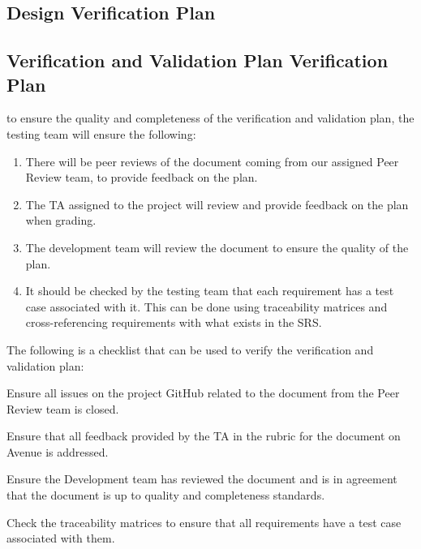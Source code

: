 \documentclass[12pt, titlepage]{article}
\begin{document}
\subsection{Design Verification Plan}




\subsection{Verification and Validation Plan Verification Plan}

to ensure the quality and completeness of the verification and
validation plan, the testing team will ensure the following:

\begin{enumerate}
  \item There will be peer reviews of the document coming from our
    assigned Peer Review team, to provide feedback on the plan.
  \item The TA assigned to the project will review and provide
    feedback on the plan when grading.
  \item The development team will review the document to ensure the
    quality of the plan.
  \item It should be checked by the testing team that each
    requirement has a test case associated with it. This can be done
    using traceability matrices and cross-referencing requirements
    with what exists in the SRS.
\end{enumerate}

The following is a checklist that can be used to verify the
verification and validation plan:
\begin{todolist}
\item Ensure all issues on the project GitHub related to the document
  from the Peer Review team is closed.
\item Ensure that all feedback provided by the TA in the rubric for
  the document on Avenue is addressed.
\item Ensure the Development team has reviewed the document and is in
  agreement that the document is up to quality and completeness standards.
\item Check the traceability matrices to ensure that all requirements
  have a test case associated with them.
\end{todolist}
\end{document}
